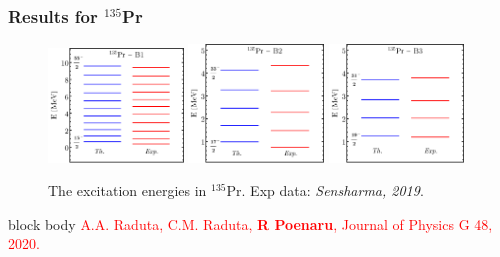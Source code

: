 \documentclass{beamer}
\begin{document}
\begin{frame}
	\frametitle{Results for $^{135}$Pr}
	\begin{figure}
		\centering
		\includegraphics[width=0.32\textwidth]{figures/new-boson/135Pr-New-Boson-Band1-Energies.pdf}
		\includegraphics[width=0.32\textwidth]{figures/new-boson/135Pr-New-Boson-Band2-Energies.pdf}
		\includegraphics[width=0.32\textwidth]{figures/new-boson/135Pr-New-Boson-Band3-Energies.pdf}
		\caption{The excitation energies in $^{135}$Pr. Exp data: \textit{Sensharma, 2019}.}
	\end{figure}
	\begin{beamercolorbox}[rounded=true,shadow=false, wd=\linewidth,]{block body}
		\centering
		\textcolor{red}{\footnotesize{A.A. Raduta, C.M. Raduta, \textbf{R Poenaru}, Journal of Physics G 48, 2020.}}
	\end{beamercolorbox}
\end{frame}


\end{document}
